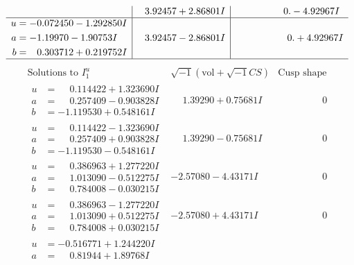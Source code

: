 \documentclass[1p]{elsarticle_modified}
\theoremstyle{definition}
\newcommand{\I}{\sqrt{-1}}
\begin{document}
$$\begin{array}{c|c|c}
 & \phantom{-}3.92457 + 2.86801 I & \phantom{-0.000000 } 0. - 4.92967 I \\ \hline\begin{aligned}
u &= -0.072450 - 1.292850 I \\
a &= -1.19970 - 1.90753 I \\
b &= \phantom{-}0.303712 + 0.219752 I\end{aligned}
 & \phantom{-}3.92457 - 2.86801 I & \phantom{-0.000000 -}0. + 4.92967 I\\
 \hline 
 \end{array}$$\newpage$$\begin{array}{c|c|c}  
\text{Solutions to }I^u_{1}& \I (\text{vol} + \sqrt{-1}CS) & \text{Cusp shape}\\
 \hline 
\begin{aligned}
u &= \phantom{-}0.114422 + 1.323690 I \\
a &= \phantom{-}0.257409 - 0.903828 I \\
b &= -1.119530 + 0.548161 I\end{aligned}
 & \phantom{-}1.39290 + 0.75681 I & \phantom{-0.000000 } 0 \\ \hline\begin{aligned}
u &= \phantom{-}0.114422 - 1.323690 I \\
a &= \phantom{-}0.257409 + 0.903828 I \\
b &= -1.119530 - 0.548161 I\end{aligned}
 & \phantom{-}1.39290 - 0.75681 I & \phantom{-0.000000 } 0 \\ \hline\begin{aligned}
u &= \phantom{-}0.386963 + 1.277220 I \\
a &= \phantom{-}1.013090 - 0.512275 I \\
b &= \phantom{-}0.784008 - 0.030215 I\end{aligned}
 & -2.57080 - 4.43171 I & \phantom{-0.000000 } 0 \\ \hline\begin{aligned}
u &= \phantom{-}0.386963 - 1.277220 I \\
a &= \phantom{-}1.013090 + 0.512275 I \\
b &= \phantom{-}0.784008 + 0.030215 I\end{aligned}
 & -2.57080 + 4.43171 I & \phantom{-0.000000 } 0 \\ \hline\begin{aligned}
u &= -0.516771 + 1.244220 I \\
a &= \phantom{-}0.81944 + 1.89768 I \\

\end{aligned}
\end{array}$$
\end{document}

